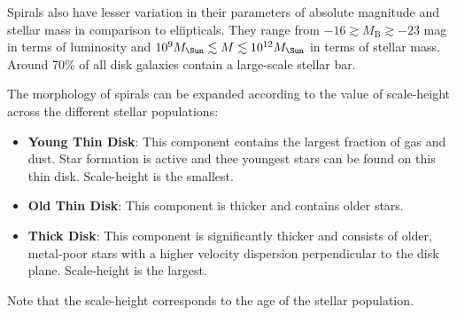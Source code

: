 \documentclass[a4paper,11pt]{report}
\newcommand{\tb}[1]{\textbf{#1}}
\newcommand{\MS}{M_\text{\Sun}}
\begin{document}
Spirals also have lesser variation in their parameters of absolute magnitude and stellar mass in comparison to eliipticals. They range from $-16 \gtrsim M_\text{B} \gtrsim -23$ mag in terms of luminosity and $10^9 \MS \lesssim M \lesssim 10^{12} \MS$ in terms of stellar mass. Around 70\% of all disk galaxies contain a large-scale stellar bar.

\vspace{1em}

The morphology of spirals can be expanded according to the value of scale-height across the different stellar populations: \label{def:disk thickness classification}
\begin{itemize}
  \item \tb{Young Thin Disk}: This component contains the largest fraction of gas and dust. Star formation is active and thee youngest stars can be found on this thin disk. Scale-height is the smallest.
  \item \tb{Old Thin Disk}: This component is thicker and contains older stars.
  \item \tb{Thick Disk}: This component is significantly thicker and consists of older, metal-poor stars with a higher velocity dispersion perpendicular to the disk plane. Scale-height is the largest.
\end{itemize}
Note that the scale-height corresponds to the age of the stellar population.

\end{document}
